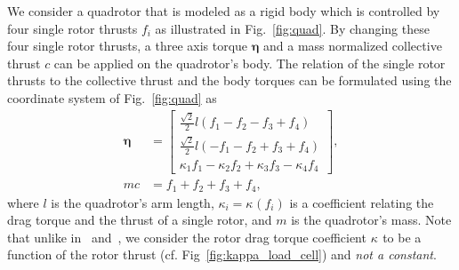\documentclass[10pt,a4paper,fleqn]{article}
\newcommand{\bodytorque}[0]{\eta}
\newcommand{\bodytorques}[0]{\boldsymbol{\bodytorque}}
\newcommand{\thrust}[0]{c} %
\newcommand{\rotthrust}[1]{f_{#1}}
\newcommand{\armlength}[0]{l}
\newcommand{\torquecoeff}[1]{\kappa_{#1}}
\newcommand{\mass}[0]{m}
\begin{document}
We consider a quadrotor that is modeled as a rigid body which is controlled by four single rotor thrusts $\rotthrust{i}$ as illustrated in Fig.~\ref{fig:quad}.
By changing these four single rotor thrusts, a three axis torque $\bodytorques$ and a mass normalized collective thrust $\thrust$ can be applied on the quadrotor's body.
The relation of the single rotor thrusts to the collective thrust and the body torques can be formulated using the coordinate system of Fig.~\ref{fig:quad} as
%
\begin{align}
	\bodytorques &= \begin{bmatrix} \frac{\sqrt{2}}{2}\armlength(\rotthrust{1} - \rotthrust{2} - \rotthrust{3} + \rotthrust{4}) \\
							\frac{\sqrt{2}}{2}\armlength(-\rotthrust{1} - \rotthrust{2} + \rotthrust{3} + \rotthrust{4}) \\
							\torquecoeff{1}\rotthrust{1} - \torquecoeff{2}\rotthrust{2} + \torquecoeff{3}\rotthrust{3} - \torquecoeff{4}\rotthrust{4}
						\end{bmatrix}, \label{eq:torque_mixing}\\
    \mass \thrust &= \rotthrust{1} + \rotthrust{2} + \rotthrust{3} + \rotthrust{4}, \label{eq:collective_thrust_mixing}
\end{align}
%
where $\armlength$ is the quadrotor's arm length, ${\torquecoeff{i} = \torquecoeff{}(\rotthrust{i})}$ is a coefficient relating the drag torque and the thrust of a single rotor, and $\mass$ is the quadrotor's mass.
Note that unlike in~\cite{Lupashin14mech} and~\cite{Faessler16jfr}, we consider the rotor drag torque coefficient $\torquecoeff{}$ to be a function of the rotor thrust (cf. Fig~\ref{fig:kappa_load_cell}) and \emph{not a constant}.
\end{document}
